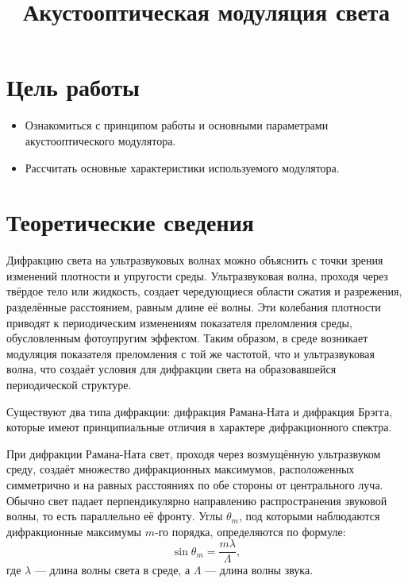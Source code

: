 \documentclass[a4paper, 12pt]{extarticle}
\title{\textcolor{main_title}{Акустооптическая модуляция света}}
\begin{document}
\maketitle



\section*{\textcolor{header}{Цель работы}}

\begin{itemize}
    \item Ознакомиться с принципом работы и основными параметрами акустооптического модулятора.
    \item Рассчитать основные характеристики используемого модулятора.
\end{itemize}

\section*{\textcolor{header}{Теоретические сведения}}



Дифракцию света на ультразвуковых волнах можно объяснить с точки зрения изменений плотности и упругости среды. Ультразвуковая волна, проходя через твёрдое тело или жидкость, создает чередующиеся области сжатия и разрежения, разделённые расстоянием, равным длине её волны. Эти колебания плотности приводят к периодическим изменениям показателя преломления среды, обусловленным фотоупругим эффектом. Таким образом, в среде возникает модуляция показателя преломления с той же частотой, что и ультразвуковая волна, что создаёт условия для дифракции света на образовавшейся периодической структуре.

Существуют два типа дифракции: дифракция Рамана-Ната и дифракция Брэгга, которые имеют принципиальные отличия в характере дифракционного спектра.


При дифракции Рамана-Ната свет, проходя через возмущённую ультразвуком среду, создаёт множество дифракционных максимумов, расположенных симметрично и на равных расстояниях по обе стороны от центрального луча. Обычно свет падает перпендикулярно направлению распространения звуковой волны, то есть параллельно её фронту. Углы $\theta_m$, под которыми наблюдаются дифракционные максимумы $m$-го порядка, определяются по формуле:
\begin{equation}
    \sin \theta_m = \frac{m \lambda}{\Lambda},
\end{equation}
где $\lambda$ — длина волны света в среде, а $\Lambda$ — длина волны звука.
\end{document}
